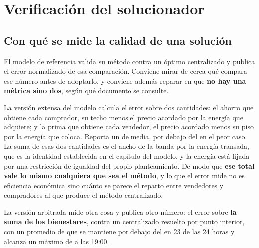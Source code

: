 %
%
\section{Verificación del solucionador}
\label{sec:verif}
\justifying

\subsection{Con qué se mide la calidad de una solución}
\label{sub:verif-medida}

El modelo de referencia valida su método contra un óptimo centralizado y
publica el error normalizado de esa comparación. Conviene mirar de cerca qué
compara ese número antes de adoptarlo, y conviene además reparar en que
\textbf{no hay una métrica sino dos}, según qué documento se consulte.

La versión extensa del modelo calcula el error sobre dos cantidades: el
ahorro que obtiene cada comprador, su techo menos el precio acordado por la
energía que adquiere; y la prima que obtiene cada vendedor, el precio
acordado menos su piso por la energía que coloca. Reporta un  de
media, por debajo del  en el peor caso. La suma de esas dos
cantidades es el ancho de la banda por la energía transada, que es la
identidad establecida en el capítulo del modelo, y la energía está fijada
por una restricción de igualdad del propio planteamiento. De modo que
\textbf{ese total vale lo mismo cualquiera que sea el método}, y lo que el
error mide no es eficiencia económica sino cuánto se parece el reparto entre
vendedores y compradores al que produce el método centralizado.

La versión arbitrada mide otra cosa y publica otro número: el error sobre
\textbf{la suma de los bienestares}, contra un centralizado resuelto por
punto interior, con un promedio de  que se mantiene por debajo del
 en \num{23} de las \num{24} horas y alcanza un máximo de
 a las 19:00.

